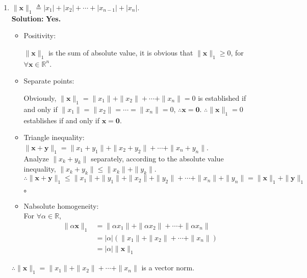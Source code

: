 \documentclass[12pt, letterpaper, onecolumn]{article}
\begin{document}
\begin{enumerate}[start=2]
\begin{enumerate}
			\item $\|\bm{x}\|_1\triangleq|x_1|+|x_2|+\cdots+|x_{n-1}|+|x_n|$.\\%
			\textbf{Solution:}
			\textbf{Yes.}
			\begin{itemize}
				\item Positivity:
				
				$\|\bm{x}\|_{1}$ is the sum of absolute value, it is obvious that $\|\bm{x}\|_{1}\geqslant0$, for $\forall\bm{x}\in\mathbb{R}^{n}$.
				\item Separate points:
				
				Obviously, $\|\bm{x}\|_{1}=\|x_{1}\|+\|x_{2}\|+\cdots+\|x_{n}\|= 0$ is established if and only if
				$\|x_{1}\|=\|x_{2}\|=\cdots=\|x_{n}\|=0$, 
				$\therefore\bm{x}=\bm{0}$. $\therefore\|\bm{x}\|_{1}=0$ establishes if and only if $\bm{x}=\bm{0}$.
				\item Triangle inequality: \
				$\|\bm{x}+\bm{y}\|_{1} =\|x_{1}+y_{1}\|+\|x_{2}+y_{2}\|+\cdots+\|x_{n}+y_{n}\|$.\\
				Analyze $\|x_{k}+y_{k}\|$ separately, according to the absolute value inequality, 
				$\|x_{k}+y_{k}\|\leqslant\|x_{k}\|+\|y_{k}\|$.\\
				$\therefore\|\bm{x}+\bm{y}\|_{1}\leqslant\|x_{1}\|+\|y_{1}\|+\|x_{2}\|+\|y_{2}\|+\cdots+\|x_{n}\|+\|y_{n}\|=\|\bm{x}\|_{1}+\|\bm{y}\|_{1}$。
				\item Nabsolute homogeneity:\\
				For $\forall\alpha\in\mathbb{R}$,
				\begin{align*}
					\|\alpha\bm{x}\|_{1}
					&=\|\alpha x_{1}\|+\|\alpha x_{2}\|+\cdots+\|\alpha x_{n}\|\\
					&=|\alpha|(\|x_{1}\|+\|x_{2}\|+\cdots+\|x_{n}\|)\\
					&=|\alpha|\|\bm{x}\|_{1}
				\end{align*}
			\end{itemize}
			$\therefore\|\bm{x}\|_{1}=\|x_{1}\|+\|x_{2}\|+\cdots+\|x_{n}\|$ is a vector norm.


\end{enumerate}
\end{enumerate}
\end{document}
